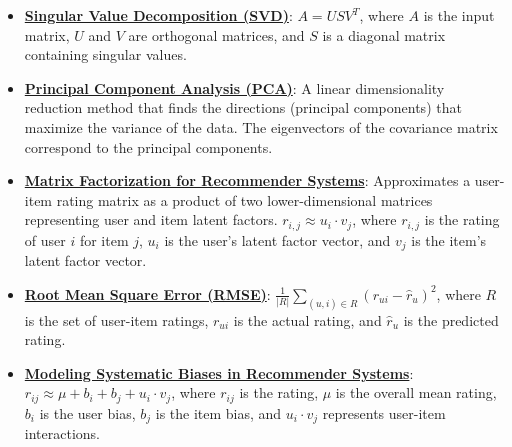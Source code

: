\documentclass{article}%
\begin{document}
\begin{itemize}[leftmargin=*]%
\item \href{https://purdue.brightspace.com/d2l/common/assets/pdfjs-d2l-dist/1.0.14-legacy/web/viewer.html?file=\%2Fcontent\%2Fenforced\%2F1095467-wl.202510.CS.24300.001\%2F11L2-svd-pca-recommender.pdf\%3Fou\%3D1095467\&lang=en-us\&container=d2l-fileviewer-rendered-pdf\&fullscreen=d2l-fileviewer-rendered-pdf-dialog\&height=667#page=10}{\textbf{Singular Value Decomposition (SVD)}}: $A = USV^T$, where $A$ is the input matrix, $U$ and $V$ are orthogonal matrices, and $S$ is a diagonal matrix containing singular values.%
\item \href{https://purdue.brightspace.com/d2l/common/assets/pdfjs-d2l-dist/1.0.14-legacy/web/viewer.html?file=\%2Fcontent\%2Fenforced\%2F1095467-wl.202510.CS.24300.001\%2F11L2-svd-pca-recommender.pdf\%3Fou\%3D1095467\&lang=en-us\&container=d2l-fileviewer-rendered-pdf\&fullscreen=d2l-fileviewer-rendered-pdf-dialog\&height=667#page=17}{\textbf{Principal Component Analysis (PCA)}}: A linear dimensionality reduction method that finds the directions (principal components) that maximize the variance of the data. The eigenvectors of the covariance matrix correspond to the principal components.%
\item \href{https://purdue.brightspace.com/d2l/common/assets/pdfjs-d2l-dist/1.0.14-legacy/web/viewer.html?file=\%2Fcontent\%2Fenforced\%2F1095467-wl.202510.CS.24300.001\%2F11L2-svd-pca-recommender.pdf\%3Fou\%3D1095467\&lang=en-us\&container=d2l-fileviewer-rendered-pdf\&fullscreen=d2l-fileviewer-rendered-pdf-dialog\&height=667#page=36}{\textbf{Matrix Factorization for Recommender Systems}}: Approximates a user-item rating matrix as a product of two lower-dimensional matrices representing user and item latent factors. $r_{i,j} \approx u_i \cdot v_j$, where $r_{i,j}$ is the rating of user $i$ for item $j$, $u_i$ is the user's latent factor vector, and $v_j$ is the item's latent factor vector.%
\item \href{https://purdue.brightspace.com/d2l/common/assets/pdfjs-d2l-dist/1.0.14-legacy/web/viewer.html?file=\%2Fcontent\%2Fenforced\%2F1095467-wl.202510.CS.24300.001\%2F11L2-svd-pca-recommender.pdf\%3Fou\%3D1095467\&lang=en-us\&container=d2l-fileviewer-rendered-pdf\&fullscreen=d2l-fileviewer-rendered-pdf-dialog\&height=667#page=49}{\textbf{Root Mean Square Error (RMSE)}}: $\frac{1}{|R|} \sum_{(u,i) \in R} (r_{ui} - \hat{r}_u)^2$, where $R$ is the set of user-item ratings, $r_{ui}$ is the actual rating, and $\hat{r}_u$ is the predicted rating.%
\item \href{https://purdue.brightspace.com/d2l/common/assets/pdfjs-d2l-dist/1.0.14-legacy/web/viewer.html?file=\%2Fcontent\%2Fenforced\%2F1095467-wl.202510.CS.24300.001\%2F11L2-svd-pca-recommender.pdf\%3Fou\%3D1095467\&lang=en-us\&container=d2l-fileviewer-rendered-pdf\&fullscreen=d2l-fileviewer-rendered-pdf-dialog\&height=667#page=44}{\textbf{Modeling Systematic Biases in Recommender Systems}}: $r_{ij} \approx \mu + b_i + b_j + u_i \cdot v_j$, where $r_{ij}$ is the rating, $\mu$ is the overall mean rating, $b_i$ is the user bias, $b_j$ is the item bias, and $u_i \cdot v_j$ represents user-item interactions.%
\end{itemize}%
\end{document}
